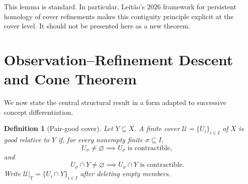 \documentclass[11pt]{article}
\newtheorem{definition}[theorem]{Definition}
\begin{document}
This lemma is standard.  In particular, Leit\~ao's 2026 framework for persistent homology of cover refinements makes this contiguity principle explicit at the cover level.  It should not be presented here as a new theorem.

\section{Observation--Refinement Descent and Cone Theorem}

We now state the central structural result in a form adapted to successive concept differentiation.

\begin{definition}[Pair-good cover]
Let $Y\subseteq X$.  A finite cover $\mathcal U=\{U_i\}_{i\in I}$ of $X$ is \emph{good relative to $Y$} if, for every nonempty finite $\sigma\subseteq I$,
\[
U_\sigma\neq\varnothing\implies U_\sigma\text{ is contractible},
\]
and
\[
U_\sigma\cap Y\neq\varnothing\implies U_\sigma\cap Y\text{ is contractible}.
\]
Write $\mathcal U|_Y=\{U_i\cap Y\}_{i\in I}$ after deleting empty members.
\end{definition}
\end{document}
